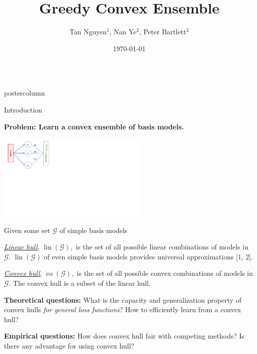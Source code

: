 \documentclass{beamer}
\title{\huge Greedy Convex Ensemble}
\author{Tan Nguyen$^{1}$, Nan Ye$^{2}$, Peter Bartlett$^{3}$}
\institute[ETH]{$^{1}$ACEMS, Queensland University of Technology, \hspace{1mm} $^{2}$University of Queensland, \hspace{1mm} $^{3}$UC Berkeley}
\date{\today}
\newcommand{\setG}{{\mathcal G}}
\DeclareMathOperator{\conv}{co}
\DeclareMathOperator{\lin}{lin}
\newcommand{\citep}{\cite}
\newlength{\columnheight}
\begin{document}
\begin{frame}

\begin{columns}

\begin{column}{.23\textwidth}

\begin{beamercolorbox}[center]{postercolumn}
\begin{minipage}{.98\textwidth}
\parbox[t][\columnheight]{\textwidth}{ 

\begin{myblock}{Introduction}

\textbf{{\color{blue}Problem:} Learn a convex ensemble of basis models.}

\hspace{4.5cm}\includegraphics[clip, trim=0cm 11cm 22cm 0cm, width=0.55\textwidth]{fig1}

Given some set $\setG$ of simple basis models

\vspace{0.2em}
\textit{\underline{Linear hull}}, $\lin(\setG),$ is the set of all possible linear combinations of models in $\setG$. $\lin(\setG)$ of even simple basis models provides universal approximations [1, 2].

\vspace{0.2em}
\textit{\underline{Convex hull}}, $\conv(\setG),$ is the set of all possible convex combinations of models in $\setG$. The convex hull is a subset of the linear hull. 

\vspace{0.2em}
\textbf{{\color{blue}Theoretical questions:}} What is the capacity and generalization property of convex hulls \emph{for general loss functions}? How to efficiently learn from a convex hull? 

\vspace{0.2em}
\textbf{{\color{blue}Empirical questions:}} How does convex hull fair with competing methods? Is there any advantage for using convex hull?


\end{myblock}}
\end{minipage}
\end{beamercolorbox}
\end{column}
\end{columns}
\end{frame}
\end{document}
